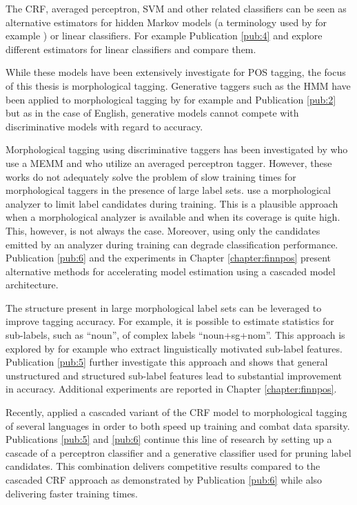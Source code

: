 The CRF, averaged perceptron, SVM and other related classifiers can be
seen as alternative estimators for hidden Markov models (a terminology
used by for example \cite{Collins2002}) or linear classifiers. For
example Publication \ref{pub:4} and \cite{Nguyen2007} explore different
estimators for linear classifiers and compare them.

While these models have been extensively investigate for POS tagging,
the focus of this thesis is morphological tagging. Generative taggers
such as the HMM have been applied to morphological tagging by for
example \cite{Halacsy2007} and Publication \ref{pub:2} but as in the
case of English, generative models cannot compete with discriminative
models with regard to accuracy.

Morphological tagging using discriminative taggers has been
investigated by \cite{Chrupala2008} who use a MEMM and
\cite{Spoustova2009} who utilize an averaged perceptron
tagger. However, these works do not adequately solve the problem of
slow training times for morphological taggers in the presence of large
label sets. \cite{Spoustova2009} use a morphological analyzer to limit
label candidates during training. This is a plausible approach when a
morphological analyzer is available and when its coverage is quite
high. This, however, is not always the case. Moreover, %
using only the candidates emitted by an analyzer during training can
degrade classification performance. Publication \ref{pub:6} and the
experiments in Chapter \ref{chapter:finnpos} present alternative
methods for accelerating model estimation using a cascaded model
architecture.

The structure present in large morphological label sets can be
leveraged to improve tagging accuracy. For example, it is possible to
estimate statistics for sub-labels, such as ``noun'', of complex
labels ``noun+sg+nom''. This approach is explored by for example
\cite{Spoustova2009} who extract linguistically motivated sub-label
features. Publication \ref{pub:5} further investigate this approach and
shows that general unstructured and structured sub-label features lead
to substantial improvement in accuracy. Additional experiments are
reported in Chapter \ref{chapter:finnpos}.

Recently, \cite{Muller2013} applied a cascaded variant of the CRF
model to morphological tagging of several languages in order to both
speed up training and combat data sparsity. Publications \ref{pub:5} and
\ref{pub:6} continue this line of research by setting up a
cascade of a perceptron classifier and a generative classifier used
for pruning label candidates. This combination delivers competitive
results compared to the cascaded CRF approach as demonstrated by
Publication \ref{pub:6} while also delivering faster training times.

